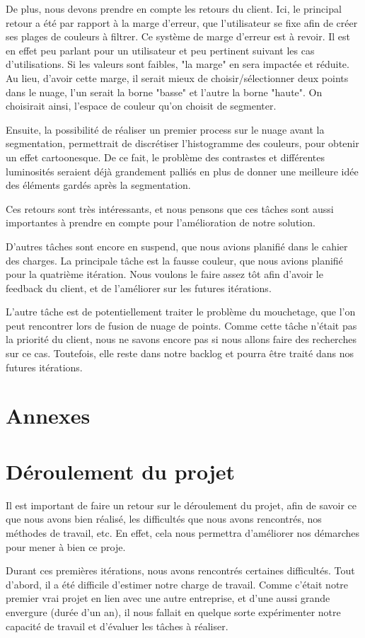 \documentclass[12pt,titlepage,french]{article}
\begin{document}
De plus, nous devons prendre en compte les retours du client. Ici, le principal retour a été par rapport à la marge d'erreur, que l'utilisateur se fixe afin de créer ses plages de couleurs à filtrer. Ce système de marge d'erreur est à revoir. Il est en effet peu parlant pour un utilisateur et peu pertinent suivant les cas d'utilisations. Si les valeurs sont faibles, "la marge" en sera impactée et réduite. Au lieu, d'avoir cette marge, il serait mieux de choisir/sélectionner deux points dans le nuage, l'un serait la borne "basse" et l'autre la borne "haute". On choisirait ainsi, l'espace de couleur qu'on choisit de segmenter.

Ensuite, la possibilité de réaliser un premier process sur le nuage avant la segmentation, permettrait de discrétiser l'histogramme des couleurs, pour obtenir un effet cartoonesque. De ce fait, le problème des contrastes et différentes luminosités seraient déjà grandement palliés en plus de donner une meilleure idée des éléments gardés après la segmentation.

Ces retours sont très intéressants, et nous pensons que ces tâches sont aussi importantes à prendre en compte pour l'amélioration de notre solution. \newline

D'autres tâches sont encore en suspend, que nous avions planifié dans le cahier des charges. La principale tâche est la fausse couleur, que nous avions planifié pour la quatrième itération. Nous voulons le faire assez tôt afin d'avoir le feedback du client, et de l'améliorer sur les futures itérations.

L'autre tâche est de potentiellement traiter le problème du mouchetage, que l'on peut rencontrer lors de fusion de nuage de points. Comme cette tâche n'était pas la priorité du client, nous ne savons encore pas si nous allons faire des recherches sur ce cas. Toutefois, elle reste dans notre backlog et pourra être traité dans nos futures itérations.

\section{Annexes}

\section{Déroulement du projet}

Il est important de faire un retour sur le déroulement du projet, afin de savoir ce que nous avons bien réalisé, les difficultés que nous avons rencontrés, nos méthodes de travail, etc. En effet, cela nous permettra d'améliorer nos démarches pour mener à bien ce proje.

Durant ces premières itérations, nous avons rencontrés certaines difficultés. Tout d'abord, il a été difficile d'estimer notre charge de travail. Comme c'était notre premier vrai projet en lien avec une autre entreprise, et d'une aussi grande envergure (durée d'un an), il nous fallait en quelque sorte expérimenter notre capacité de travail et d'évaluer les tâches à réaliser. \newline
\end{document}

